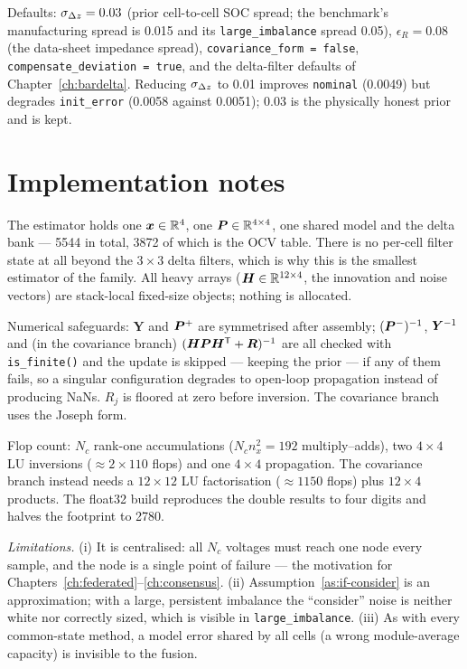 Defaults: $\sigma_{\Delta z}=\num{0.03}$ (prior cell-to-cell SOC spread; the benchmark's
manufacturing spread is \num{0.015} and its \texttt{large\_imbalance} spread \num{0.05}),
$\epsilon_R=\num{0.08}$ (the data-sheet impedance spread), \texttt{covariance\_form = false},
\texttt{compensate\_deviation = true}, and the delta-filter defaults of
Chapter~\ref{ch:bardelta}. Reducing $\sigma_{\Delta z}$ to \num{0.01} improves \texttt{nominal}
(\num{0.0049}) but degrades \texttt{init\_error} (\num{0.0058} against \num{0.0051}); \num{0.03}
is the physically honest prior and is kept.

\section{Implementation notes}
The estimator holds one $\bm{x}\in\mathbb{R}^4$, one $\bm{P}\in\mathbb{R}^{4\times4}$, one shared model and the
delta bank --- \SI{5544}{\byte} in total, \SI{3872}{\byte} of which is the OCV table. There is no
per-cell filter state at all beyond the $3\times3$ delta filters, which is why this is the
smallest estimator of the family. All heavy arrays ($\bm{H}\in\mathbb{R}^{12\times4}$, the innovation and
noise vectors) are stack-local fixed-size objects; nothing is allocated.

Numerical safeguards: $\bm{Y}$ and $\bm{P}^{+}$ are symmetrised after assembly; $(\bm{P}^{-})^{-1}$,
$\bm{Y}^{-1}$ and (in the covariance branch) $(\bm{H}\bm{P}\bm{H}^{\mathsf{T}}+\bm{R})^{-1}$ are all checked with
\texttt{is\_finite()} and the update is skipped --- keeping the prior --- if any of them fails,
so a singular configuration degrades to open-loop propagation instead of producing NaNs. $R_j$ is
floored at zero before inversion. The covariance branch uses the Joseph form.

Flop count: $N_c$ rank-one accumulations ($N_c n_x^2 = \num{192}$ multiply--adds), two $4\times4$
LU inversions ($\approx\num{2}\times\num{110}$ flops) and one $4\times4$ propagation. The
covariance branch instead needs a $12\times12$ LU factorisation ($\approx\num{1150}$ flops) plus
$12\times4$ products. The float32 build reproduces the double results to four digits and halves
the footprint to \SI{2780}{\byte}.

\emph{Limitations.} (i) It is centralised: all $N_c$ voltages must reach one node every sample,
and the node is a single point of failure --- the motivation for
Chapters~\ref{ch:federated}--\ref{ch:consensus}. (ii) Assumption~\ref{as:if-consider} is an
approximation; with a large, persistent imbalance the ``consider'' noise is neither white nor
correctly sized, which is visible in \texttt{large\_imbalance}. (iii) As with every common-state
method, a model error shared by all cells (a wrong module-average capacity) is invisible to the
fusion.

